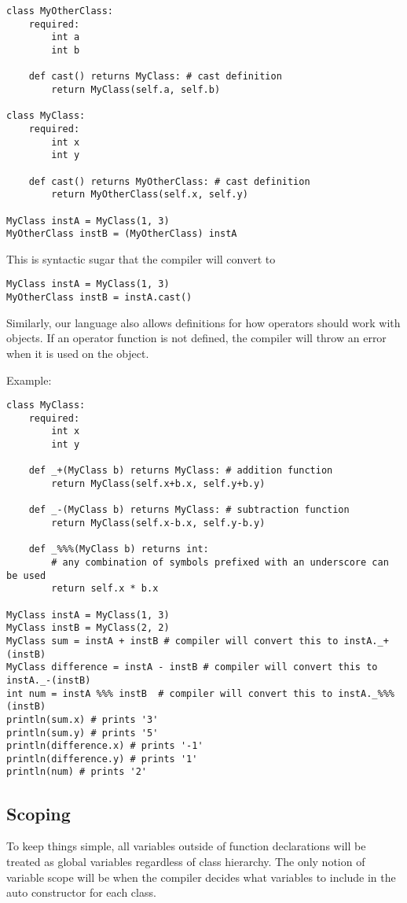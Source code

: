 \documentclass{article}
\begin{document}
\begin{verbatim}
class MyOtherClass:
    required:
        int a
        int b

    def cast() returns MyClass: # cast definition
        return MyClass(self.a, self.b)

class MyClass:
    required:
        int x
        int y

    def cast() returns MyOtherClass: # cast definition
        return MyOtherClass(self.x, self.y)

MyClass instA = MyClass(1, 3)
MyOtherClass instB = (MyOtherClass) instA

\end{verbatim}

\noindent This is syntactic sugar that the compiler will convert to 
\begin{verbatim}
MyClass instA = MyClass(1, 3)
MyOtherClass instB = instA.cast()
\end{verbatim}

\noindent Similarly, our language also allows definitions for how operators should work with objects.  If an operator function is not defined, the compiler will throw an error when it is used on the object.

Example:
\begin{verbatim}
class MyClass:
    required:
        int x
        int y

    def _+(MyClass b) returns MyClass: # addition function
        return MyClass(self.x+b.x, self.y+b.y)

    def _-(MyClass b) returns MyClass: # subtraction function
        return MyClass(self.x-b.x, self.y-b.y)
        
    def _%%%(MyClass b) returns int:
        # any combination of symbols prefixed with an underscore can be used
        return self.x * b.x
        
MyClass instA = MyClass(1, 3)
MyClass instB = MyClass(2, 2)
MyClass sum = instA + instB # compiler will convert this to instA._+(instB)
MyClass difference = instA - instB # compiler will convert this to instA._-(instB)
int num = instA %%% instB  # compiler will convert this to instA._%%%(instB)
println(sum.x) # prints '3'
println(sum.y) # prints '5'
println(difference.x) # prints '-1'
println(difference.y) # prints '1'
println(num) # prints '2'
\end{verbatim}

\subsection{Scoping}
To keep things simple, all variables outside of function declarations will be treated as global variables regardless of class hierarchy.  The only notion of variable scope will be when the compiler decides what variables to include in the auto constructor for each class. 
\end{document}
